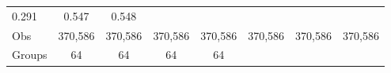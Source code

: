 \documentclass[12pt,twoside]{reedthesis}
\begin{document}
\begin{longtable}[]{@{}lccccccc@{}}
\begin{minipage}[t]{0.10\columnwidth}
  0.291\strut
  \end{minipage} & \begin{minipage}[t]{0.10\columnwidth}\centering\strut
  0.547\strut
  \end{minipage} & \begin{minipage}[t]{0.10\columnwidth}\centering\strut
  0.548\strut
  \end{minipage}\tabularnewline
  \begin{minipage}[t]{0.12\columnwidth}\raggedright\strut
  Obs\strut
  \end{minipage} & \begin{minipage}[t]{0.09\columnwidth}\centering\strut
  370,586\strut
  \end{minipage} & \begin{minipage}[t]{0.10\columnwidth}\centering\strut
  370,586\strut
  \end{minipage} & \begin{minipage}[t]{0.10\columnwidth}\centering\strut
  370,586\strut
  \end{minipage} & \begin{minipage}[t]{0.10\columnwidth}\centering\strut
  370,586\strut
  \end{minipage} & \begin{minipage}[t]{0.10\columnwidth}\centering\strut
  370,586\strut
  \end{minipage} & \begin{minipage}[t]{0.10\columnwidth}\centering\strut
  370,586\strut
  \end{minipage} & \begin{minipage}[t]{0.10\columnwidth}\centering\strut
  370,586\strut
  \end{minipage}\tabularnewline
  \begin{minipage}[t]{0.12\columnwidth}\raggedright\strut
  Groups\strut
  \end{minipage} & \begin{minipage}[t]{0.09\columnwidth}\centering\strut
  64\strut
  \end{minipage} & \begin{minipage}[t]{0.10\columnwidth}\centering\strut
  64\strut
  \end{minipage} & \begin{minipage}[t]{0.10\columnwidth}\centering\strut
  64\strut
  \end{minipage} & \begin{minipage}[t]{0.10\columnwidth}\centering\strut
  64\strut
  \end{minipage} & \begin{minipage}[t]{0.10\columnwidth}\centering\strut

\end{minipage}
\end{longtable}
\end{document}
